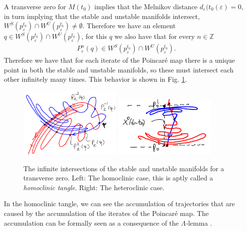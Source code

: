 A transverse zero for $M(t_0)$ implies that the Melnikov distance $d_{\varepsilon }(t_{0}(\varepsilon)=0$, in turn implying that the stable and unstable manifolds intersect, $W^{S}(p_{\varepsilon}^{t_0}) \cap W^{U}(p_{\varepsilon}^{t_0}) \neq \emptyset$. Therefore we have an element $q\in W^{S}(p_{\varepsilon}^{t_0}) \cap W^{U}(p_{\varepsilon}^{t_0})$, for this $q$ we also have that for every $n \in \mathbb{Z}$
\begin{align}
	P_{\varepsilon}^{n}(q) \in W^{S}(p_{\varepsilon}^{t_0}) \cap W^{U}(p_{\varepsilon}^{t_0}). 
\end{align}
Therefore we have that for each iterate of the Poincaré map there is a unique point in both the stable and unstable manifolds, so these must intersect each other infinitely many times. This behavior is shown in Fig. \ref{fig:inf_intersections}. 
\begin{figure}[h!]
	\centering
	\includegraphics[width=0.45\textwidth]{figures/ch6/11inf_intersection_hetero.png}
	\includegraphics[width=0.45\textwidth]{figures/ch6/11inf_intersection_homo.png}
	\caption{The infinite intersections of the stable and unstable manifolds for a transverse zero. Left: The homoclinic case, this is aptly called a \emph{homoclinic tangle}. Right: The heteroclinic case.}
	\label{fig:inf_intersections}
\end{figure}
In the homoclinic tangle, we can see the accumulation of trajectories that are caused by the accumulation of the iterates of the Poincaré map. The accumulation can be formally seen as a consequence of the $\Lambda${\emph-lemma} \cite{PalisPhd, Palis}.

